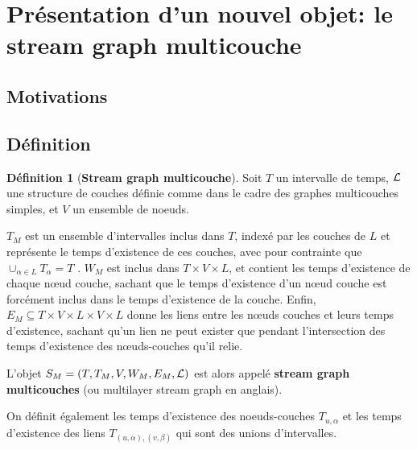 \documentclass[11pt,a4paper]{article}
\theoremstyle{definition}
\newtheorem{defn}{Définition}
\theoremstyle{remark}
\theoremstyle{remark}
\begin{document}

 
\section{Présentation d'un nouvel objet: le stream graph multicouche}



\subsection{Motivations}
\subsection{Définition}

\begin{defn}[\textbf{Stream graph multicouche}]
    
    Soit $T$ un intervalle de temps, ${\cal L}$ une structure de couches définie comme dans le cadre des graphes multicouches simples, et $V$ un ensemble de noeuds. 
    
    $T_M$ est un ensemble d'intervalles inclus dans $T$, indexé par les couches de $L$ et représente le temps d'existence de ces couches, avec pour contrainte que $\cup_{\alpha \in L} T_{\alpha} = T$ . $W_M$ est inclus dans $T \times V \times L$, et contient les temps d'existence de chaque nœud couche, sachant que le temps d'existence d'un nœud couche est forcément inclus dans le temps d'existence de la couche. Enfin, $E_M \subseteq T \times V \times L \times V \times L$ donne les liens entre les nœuds couches et leurs temps d'existence, sachant qu'un lien ne peut exister que pendant l'intersection des temps d'existence des nœuds-couches qu'il relie.
    
    L'objet $S_M = (T,T_M,V,W_M,E_M,{\cal L})$ est alors appelé \textbf{stream graph multicouches } (ou multilayer stream graph en anglais).
    
    On définit également les temps d'existence des noeuds-couches $T_{u,\alpha}$ et les temps d'existence des liens $T_{(u,\alpha),(v,\beta)}$ qui sont des unions d'intervalles.
	\end{defn}
	
\end{document}
